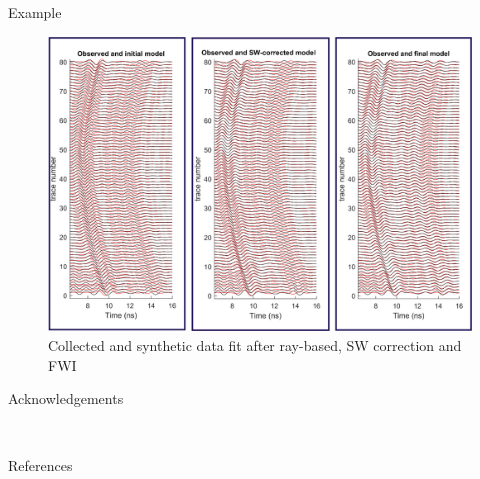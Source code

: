 \documentclass[final]{beamer}
\newlength{\onecolwid}
\begin{document}
\begin{frame}[t]
\begin{columns}[t]
\begin{column}{\onecolwid}
\begin{block}{Example}
	\begin{figure}
		\includegraphics[width=1\linewidth]{FWI_pipes_frames.png}
		\caption{Collected and synthetic data fit after ray-based, SW correction and FWI \cite{jazayeri2017}}
	\end{figure}
	
\end{block}

\vspace{1.5cm}


\begin{block}{Acknowledgements}
	
	\small{} \\
	
\end{block}

\vspace{1.5cm}

\begin{block}{References}

\nocite{*} %
\small{
\vspace{0.25in}}

\end{block}




\end{column}
\end{columns}
\end{frame}
\end{document}
